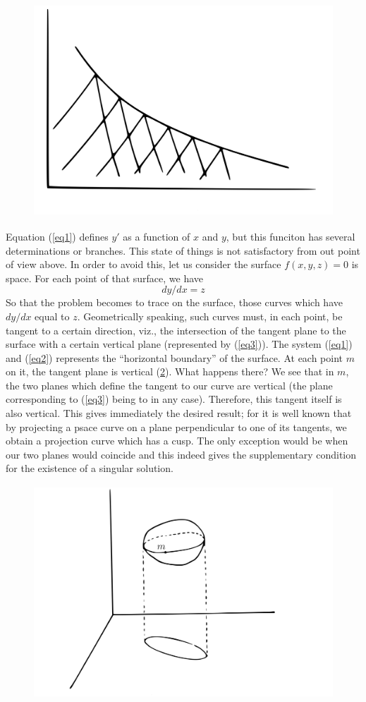 \documentclass[12pt,oneside]{book}
\begin{document}
\begin{figure}
    \centering
    \includegraphics[height=8cm]{Fig5.jpeg}
    \caption{}
    \label{Fig5}
\end{figure}

Equation (\ref{eq1}) defines $y'$ as a function of $x$ and $y$, but this funciton has several determinations or branches. This state of things is not satisfactory from out point of view above. In order to avoid this, let us consider the surface $f(x,y,z)=0$ is space. For each point of that surface, we have 
\begin{equation}
    dy/dx=z
    \label{eq3}
\end{equation}
So that the problem becomes to trace on the surface, those curves which have $dy/dx$ equal to $z$. Geometrically speaking, such curves must, in each point, be tangent to a certain direction, viz., the intersection of the tangent plane to the surface with a certain vertical plane (represented by (\ref{eq3})). The system (\ref{eq1}) and (\ref{eq2}) represents the ``horizontal boundary'' of the surface. At each point $m$ on it, the tangent plane is vertical (\ref{Fig6}). What happens there? We see that in $m$, the two planes which define the tangent to our curve are vertical (the plane corresponding to (\ref{eq3}) being to in any case). Therefore, this tangent itself is also vertical. This gives immediately the desired result; for it is well known that by projecting a psace curve on a plane perpendicular to one of its tangents, we obtain a projection curve which has a cusp. The only exception would be when our two planes would coincide and this indeed gives the supplementary condition for the existence of a singular solution. \par 

\begin{figure}
    \centering
    \includegraphics[height=8cm]{Fig6.jpeg}
    \label{Fig6}
\end{figure}
\end{document}
